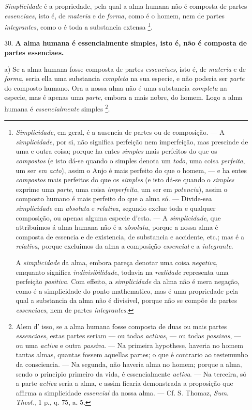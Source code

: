 
\emph{Simplicidade} é a propriedade, pela qual a alma humana não é composta de partes \emph{essenciaes}, isto é, de \emph{materia} e de \emph{forma}, como é o homem, nem de partes \emph{integrantes}, como o é toda a substancia extensa \footnote{\emph{Simplicidade}, em geral, é a ausencia de partes ou de composição. --- A \emph{simplicidade}, por si, não significa perfeição nem imperfeição, mas prescinde de uma e outra coisa; porque ha entes \emph{simples} mais perfeitos do que os \emph{compostos} (e isto dá-se quando o simples denota um \emph{todo}, uma coisa \emph{perfeita}, um ser \emph{em acto}), assim o Anjo é mais perfeito do que o homem, --- e ha entes \emph{compostos} mais perfeitos do que os \emph{simples} (e isto dá-se quando o \emph{simples} exprime uma \emph{parte}, uma coisa \emph{imperfeita}, um ser em \emph{potencia}), assim o composto humano é mais perfeito do que a alma só. --- Divide-sea \emph{simplicidade} em \emph{absoluta} e \emph{relativa}, segundo exclue toda e qualquer composição, ou apenas alguma especie d'esta. --- A \emph{simplicidade}, que attribuimos á alma humana não é a \emph{absoluta}, porque a nossa alma é composta de essencia e de existencia, de substancia e accidente, etc.; mas é a \emph{relativa}, porque excluimos da alma a composição \emph{essencial} e a \emph{integrante}.\par A \emph{simplicidade} da alma, embora pareça denotar uma coisa \emph{negativa}, emquanto significa \emph{indivisibilidade}, todavia na \emph{realidade} representa uma perfeição \emph{positiva}. Com effeito, a \emph{simplicidade} da alma não é mera negação, como é a simplicidade do ponto mathematico, mas é uma propriedade pela qual a substancia da alma não é divisivel, porque não se compõe de partes \emph{essenciaes}, nem de partes \emph{integrantes}.}.

30. \textbf{A alma humana é essencialmente simples, isto é, não é composta de partes essenciaes.}

a) Se a alma humana fosse composta de partes \emph{essenciaes}, isto é, de \emph{materia} e de \emph{forma}, seria ella uma substancia   \emph{completa} na sua especie, e não poderia ser \emph{parte} do composto humano. Ora a nossa alma não é uma substancia \emph{completa} na especie, mas é apenas uma \emph{parte}, embora a mais nobre, do homem. Logo a alma humana é \emph{essencialmente} simples \footnote{Alem d' isso, se a alma humana fosse composta de duas ou mais partes \emph{essenciaes}, estas partes seriam --- ou todas \emph{activas}, --- ou todas \emph{passivas}, --- ou uma \emph{activa} e outra \emph{passiva}. --- Na primeira hypothese, haveria no homem tantas almas, quantas fossem aquellas partes; o que é contrario ao testemunho da consciencia. --- Na segunda, não haveria alma no homem; porque a alma, sendo o principio primeiro da vida, é essencialmente \emph{activa}. --- Na terceira, só a parte \emph{activa} seria a alma, e assim ficaria demonstrada a proposição que affirma a simplicidade \emph{essencial} da nossa alma. --- Cf. S. Thomaz, \emph{Sum. Theol.}, 1 p., q. 75, a. 5.}.

